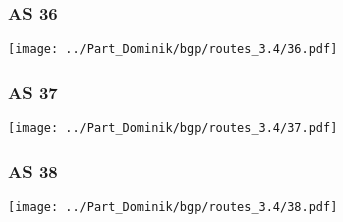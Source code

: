\subsubsection{AS 36}
\texttt{[image: ../Part\_Dominik/bgp/routes\_3.4/36.pdf]}
\clearpage
\subsubsection{AS 37}
\texttt{[image: ../Part\_Dominik/bgp/routes\_3.4/37.pdf]}
\clearpage
\subsubsection{AS 38}
\texttt{[image: ../Part\_Dominik/bgp/routes\_3.4/38.pdf]}
